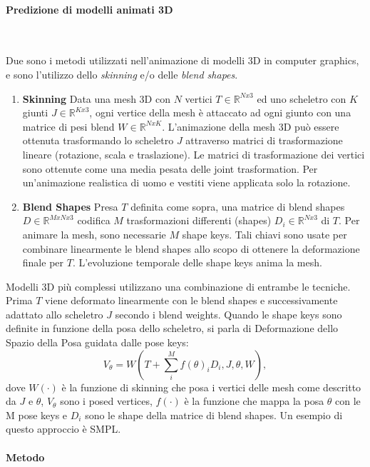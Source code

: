 \paragraph{Predizione di modelli animati 3D}~

Due sono i metodi utilizzati nell’animazione di modelli 3D in computer graphics, e sono l’utilizzo dello \emph{skinning }e/o delle \emph{blend shapes}.

\begin{enumerate}
	\item \textbf{Skinning}
	Data una mesh 3D con $N$ vertici $T \in \mathbb{R}^{Nx3}$ ed uno scheletro con $K$ giunti $J \in \mathbb{R}^{Kx3}$, ogni vertice della mesh è attaccato ad ogni giunto con una matrice di pesi blend $W \in \mathbb{R}^{NxK}$. L’animazione della mesh 3D può essere ottenuta trasformando lo scheletro $J$ attraverso matrici di trasformazione lineare (rotazione, scala e traslazione). Le matrici di trasformazione dei vertici sono ottenute come una media pesata delle joint trasformation. Per un’animazione realistica di uomo e vestiti viene applicata solo la rotazione.
	\item \textbf{Blend Shapes}
	Presa $T$ definita come sopra, una matrice di blend shapes $D \in  \mathbb{R}^{MxNx3}$ codifica $M$ trasformazioni differenti (shapes) $D_i \in  \mathbb{R}^{Nx3}$ di $T$. Per animare la mesh, sono necessarie $M$ shape keys. Tali chiavi sono usate per combinare linearmente le blend shapes allo scopo di ottenere la deformazione finale per $T$. L’evoluzione temporale delle shape keys anima la mesh.
\end{enumerate}

Modelli 3D più complessi utilizzano una combinazione di entrambe le tecniche. Prima $T$ viene deformato linearmente con le blend shapes e successivamente adattato allo scheletro $J$ secondo i blend weights.
Quando le shape keys sono definite in funzione della posa dello scheletro, si parla di Deformazione dello Spazio della Posa guidata dalle pose keys:
\[
V_{\theta} = W \left( T + \sum_{i}^{M} f(\theta)_{i} D_{i}, J, \theta, W \right),
\]
dove $W(\cdot)$ è la funzione di skinning che posa i vertici delle mesh come descritto da $J$ e $\theta$, $V_\theta$ sono i posed vertices, $f(\cdot)$ è la funzione che mappa la posa $\theta$ con le M pose keys e $D_i$ sono le shape della matrice di blend shapes. Un esempio di questo approccio è SMPL.

\paragraph{Metodo}~

